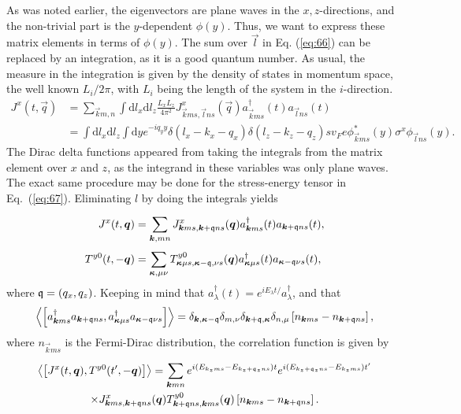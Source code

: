 As was noted earlier, the eigenvectors are plane waves in the $x, z$-directions, and the non-trivial part is the $y$-dependent $\phi (y)$.
Thus, we want to express these matrix elements in terms of $\phi (y)$.
The sum over $\vec{l}$ in Eq. (\ref{eq:66}) can be replaced by an integration, as it is a good quantum number.
As usual, the measure in the integration is given by the density of states in momentum space, the well known $L_{i} /2\pi $, with $L_i$ being the length of the system in the $i$-direction.
\begin{align}
  J^x(t, \vec{q}) &= \sum\limits_{\vec{k}m, n}^{} \int \mathrm{d}l_x \mathrm{d}l_z \frac{L_xL_z}{4 \pi ^2}
                    J^x_{\vec{k}ms, \vec{l}ns} (\vec{q}) a^{\dagger}_{\vec{k} ms} (t) a_{\vec{l} ns}(t)\\
  \nonumber &= \int \mathrm{d}l_x \mathrm{d} l_{z} \int \mathrm{d} y e^{-i q_y y}
                    \delta (l_x - k_x - q_x) \delta (l_z - k_z -  q_z)
                    sv_F e \phi ^{*}_{\vec{k} ms}(y) \sigma ^x \phi _{\vec{l}ns}(y).
\end{align}
The Dirac delta functions appeared from taking the integrals from the matrix element over $x$ and $z$, as the integrand in these variables was only plane waves.
The exact same procedure may be done for the stress-energy tensor in Eq.~(\ref{eq:67}).
Eliminating $l$ by doing the integrals yields
\begin{align}
  J^x(t, \bm{q}) &= \sum\limits_{\bm{k}, mn}^{}
                    J^x_{\bm{k}ms, \bm{k}+\mathfrak{q} ns}(\bm{q}) a^{\dagger}_{\bm{k} ms}(t) a_{\bm{k}+\mathfrak{q} ns}(t),\\
  T^{y 0}(t, -\bm{q}) &= \sum\limits_{\bm{\kappa}, \mu  \nu }^{} T^{y 0}_{\bm{\kappa } \mu  s, \bm{\kappa } - \mathfrak{q}, \nu  s}(\bm{q}) a^{\dagger}_{\bm{\kappa } \mu   s}(t) a_{\bm{\kappa } - \mathfrak{q} \nu  s}(t),
\end{align}
where ${\mathfrak{q}} = (q_x, q_z)$.
Keeping in mind that $a_{\lambda }^{\dagger} (t) = e^{i E_{\lambda } t /  }a_{\lambda }^{\dagger}$, and that
\begin{equation}
  \Braket{\left[
a^{\dagger}_{\bm{k}ms} a_{\bm{k}+\mathfrak{q} ns}, a^{\dagger}_{\bm{\kappa}\mu s} a_{\bm{\kappa}-\mathfrak{q} \nu  s}
\right]}
=
\delta_{\bm{k}, \bm{\kappa}-\mathfrak{q}}
\delta _{m, \nu }
\delta _{\bm{k}+\mathfrak{q}, \bm{\kappa}}
\delta _{n, \mu }
\left[ n_{\bm{k}ms}- n_{\bm{k}+\mathfrak{q} ns} \right],
\end{equation}
where \( n_{\vec{k} m s} \) is the Fermi-Dirac distribution, the correlation function is given by
\begin{multline}
  \Braket{\left[ J^x(t, \bm{q}), T^{y 0}(t', -\bm{q}) \right]}
  =
  \sum\limits_{\bm{k} mn}^{}
  e^{i( E_{k_zms} - E_{k_z+\mathfrak{q}_z ns} )t}
  e^{i( E_{k_z+\mathfrak{q}_z ns} - E_{k_z ms} ) t'}\\
  \times
  J^x_{\bm{k}ms, \bm{k}+\mathfrak{q}ns}(\bm{q})
  T^{y 0}_{\bm{k}+\mathfrak{q}ns, \bm{k}ms}(\bm{q})
  \left[ n_{\bm{k}ms}- n_{\bm{k}+\mathfrak{q} ns} \right].
\end{multline}

